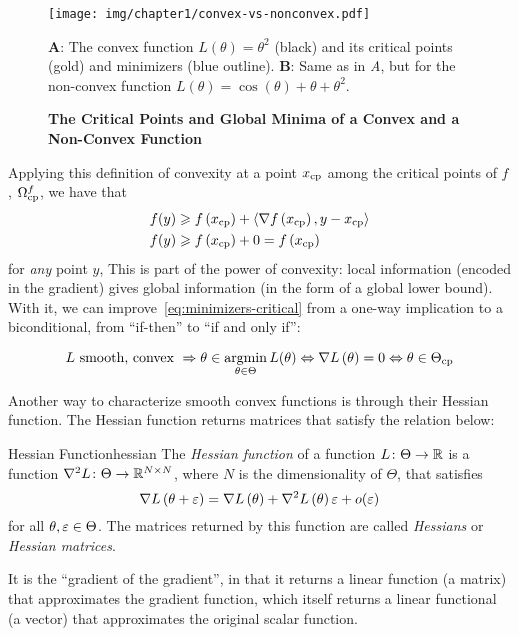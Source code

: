 \documentclass[../../thesis.tex]{subfiles}
\begin{document}
\begin{figure}[ht]
	\begin{center}
		\texttt{[image: img/chapter1/convex-vs-nonconvex.pdf]}
	\end{center}
	\caption{\textbf{The Critical Points and Global Minima
	of a Convex and a Non-Convex Function}}{\textbf{A}:
	The convex function $L(\theta) = \theta^2$ (black)
	and its critical points (gold)
	and minimizers (blue outline).
	\textbf{B}:
	Same as in \emph{A}, but for the non-convex function
	$L(\theta) = \cos(\theta) + \theta +\theta^2$.}
\end{figure}

Applying this definition of convexity at a point $x_{\mathrm{cp}}$
among the critical points of $f$, $\Omega^f_{\mathrm{cp}}$,
we have that
\begin{align}
	f(y) &\geqslant f\left(x_{\mathrm{cp}}\right) + \langle\nabla f\left(x_{\mathrm{cp}}\right), y - x_{\mathrm{cp}} \rangle\\
	f(y) &\geqslant f\left(x_{\mathrm{cp}}\right) + 0 = f\left(x_{\mathrm{cp}}\right)
\end{align}
for \emph{any} point $y$,
This is part of the power of convexity:
local information (encoded in the gradient)
gives global information (in the form of a global lower bound).
With it, we can improve~\ref{eq:minimizers-critical}
from a one-way implication to a biconditional,
from \enquote{if-then} to
\enquote{if and only if}:

\begin{equation}\equationlabel{convexity-critical}
	L \text{\ smooth, convex\ } \Rightarrow\\
	\theta \in \argmin_{\theta \in \Theta} L(\theta)
	\Leftrightarrow \grad{L}{\theta} = 0
	\Leftrightarrow \theta \in \Theta_{\cp}
\end{equation}

Another way to characterize smooth convex functions is through their Hessian function.
The Hessian function returns matrices that satisfy the relation below:
\begin{definition}{Hessian Function}{hessian}
	The \emph{Hessian function} of a function $L \colon \Theta \to \mathbb{R}$
	is a function $\nabla^2{L} \colon \Theta \to \mathbb{R}^{N\times N}$,
	where $N$ is the dimensionality of $\Theta$,
	that satisfies
	\begin{equation}\equationlabel{def-hessian}
		\grad{L}{\theta + \eps} = \grad{L}{\theta} + \hess{L}{\theta}\eps + o(\eps)
	\end{equation}
	for all $\theta, \varepsilon \in \Theta$.
	The matrices returned by this function are called \emph{Hessians}
	or \emph{Hessian matrices}.
\end{definition}
It is the \enquote{gradient of the gradient},
in that it returns a linear function (a matrix)
that approximates the gradient function,
which itself returns a linear functional (a vector)
that approximates the original scalar function.
\end{document}
